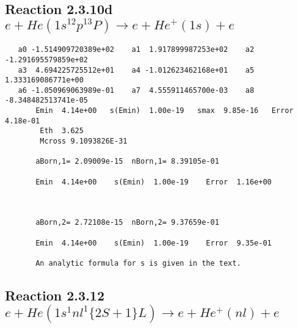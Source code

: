 \documentclass[12pt,dvipdfm]{article}
\begin{document}
\newpage
\subsection{
Reaction 2.3.10d $e + He(1s^12p^13P) \rightarrow e + He^+(1s) + e$}














\begin{small}\begin{verbatim}
   a0 -1.514909720389e+02    a1  1.917899987253e+02    a2 -1.291695579859e+02
   a3  4.694225725512e+01    a4 -1.012623462168e+01    a5  1.333169086771e+00
   a6 -1.050969063989e-01    a7  4.555911465700e-03    a8 -8.348482513741e-05
       Emin  4.14e+00   s(Emin)  1.00e-19   smax  9.85e-16   Error  4.18e-01
        Eth  3.625
        Mcross 9.1093826E-31

       aBorn,1= 2.09009e-15  nBorn,1= 8.39105e-01

       Emin  4.14e+00    s(Emin)  1.00e-19    Error  1.16e+00



       aBorn,2= 2.72108e-15  nBorn,2= 9.37659e-01

       Emin  4.14e+00    s(Emin)  1.00e-19    Error  9.35e-01

       An analytic formula for s is given in the text.
\end{verbatim}\end{small}









\newpage
\subsection{
Reaction 2.3.12 $e + He(1s^1nl^1  \{2S+1\}L) \rightarrow e + He^+(nl)+e$}






\end{document}
